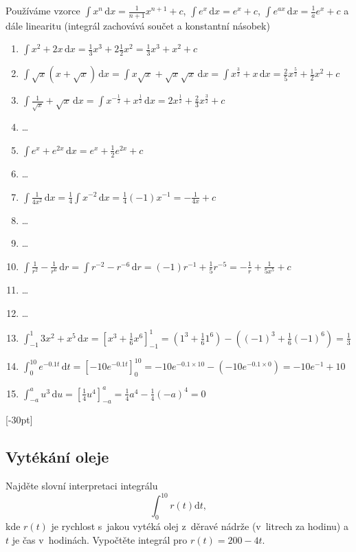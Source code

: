 Používáme vzorce $\int x^n\,\mathrm dx=\frac 1{n+1}x^{n+1}+c$, $\int e^x\,\mathrm dx=e^x+c$, $\int e^{ax}\,\mathrm dx=\frac 1a e^x+c$ a dále linearitu (integrál zachovává součet a konstantní násobek)
\begin{enumerate}[(1)]
  \def\dx{\,\mathrm dx}
\item   $\int x^2+2x\dx=\frac 13 x^3 + 2\frac 12 x^2 = \frac 13 x^3+x^2+c$
\item  $\int \sqrt x(x+\sqrt x)\dx=\int x\sqrt x+\sqrt x\sqrt x\dx=\int x^{\frac 32}+x\dx=\frac 25 x^{\frac 52}+\frac 12 x^2+c$
\item  $\int \frac 1{\sqrt x}+\sqrt x \,\mathrm dx=\int x^{-\frac 12}+x^{\frac 12}\,\mathrm dx=2x^\frac 12+\frac 23 x^{\frac 32}+c$
\item \dots
\item $\int e^x+e^{2x}\,\mathrm dx=e^x+\frac 12 e^{2x}+c$
\item \dots
\item $\int\frac{1}{4x^2}\,\mathrm dx=\frac 14 \int x^{-2}\,\mathrm dx=\frac 14  (-1)x^{-1}=-\frac {1}{4x}+c$
\item \dots
\item \dots
\item $\int \frac 1{r^2}-\frac 1{r^6}\,\mathrm dr=\int r^{-2}-r^{-6}\,\mathrm dr=(-1)r^{-1}+\frac 15 r^{-5}=-\frac 1r+\frac 1{5x^5}+c$
\item \dots
\item \dots
\item $\int_{-1}^1 3x^2+x^5\,\mathrm dx=\left[x^3+\frac 16 x^6\right]_{-1}^1=\left(1^3+\frac 16 1^6\right)-\left((-1)^3+\frac 16 (-1)^6\right)=\frac 13$
\item $\int_0^{10} e^{-0.1 t}\,\mathrm dt=\left[-10 e^{-0.1t}\right]_0^{10}=-10 e^{-0.1\times 10}-\left(-10 e^{-0.1\times 0}\right)=-10 e^{-1}+10$
\item  $\int_{-a}^{a} u^3\,\mathrm du=\left[\frac 14 u^4\right]_{-a}^a=\frac 14 a^4 - \frac 14 (-a)^4 = 0$
\end{enumerate}

\konec


\stranka

[-30pt]

\subsection{Vytékání oleje} Najděte slovní interpretaci integrálu
\begin{equation*}
  \int_0^{10} r(t)\mathrm dt,
\end{equation*}
kde $r(t)$ je rychlost s~jakou vytéká olej z~děravé nádrže (v~litrech
za hodinu) a $t$ je čas v~hodinách. Vypočtěte integrál pro $r(t)=200-4t$.

